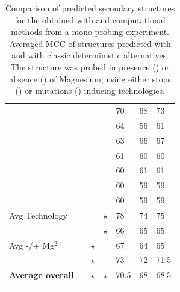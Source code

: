 \documentclass[a4,center,fleqn]{NAR}
\begin{document}
\begin{table}
{\begin{adjustbox}{max width=\linewidth}
\begin{tabular}{@{}lcccHHH}
			\CMCTMg                      &  &  \Stop  &    \Mg    & 70                                   & 68                  & 73                \\
			\OneMSevILUThree                     &  &  \Mut   &   \NoMg   & 64                                   & 56                  & 61                \\
			\DMSMg                       &  &  \Stop  &    \Mg    & 63                                   & 66                  & 67                \\
			\NMIACE                      &  &  \Stop  &   \NoMg   & 61                                   & 60                  & 60                \\
			\OneMSevCE                       &  &  \Stop  &   \NoMg   & 60                                   & 61                  & 61                \\
			\BzCN                        &  &  \Stop  &   \NoMg   & 60                                   & 59                  & 59                \\
			\NAICE                         &  &  \Stop  &   \NoMg   & 60                                   & 59                  & 59                \\ \midrule
			Avg Technology              &          &  \Mut   &  $\star$  & 78                                   & 74                  & 75                \\
			                            &          &  \Stop  &  $\star$  & 66                                   & 65                  & 65                \\
			Avg -/+ Mg$^{2+}$           &          & $\star$ &   \NoMg   & 67                                   & 64                  & 65                \\
			                            &          & $\star$ &    \Mg    & 73                                   & 72                  & 71.5               \\ \midrule
			{\bfseries Average overall} &          & $\star$ &  $\star$  & 70.5                                 & 68                  & 68.5               \\ \bottomrule
			                            &          &         &           &
		\end{tabular}
		\end{adjustbox}\\[1em]}
	
	\caption{Comparison of predicted secondary structures for the \didy{} obtained with \OurTool{} and computational methods from a mono-probing experiment. Averaged MCC of structures predicted with \OurTool{} and with classic deterministic alternatives. The structure was probed in presence (\Mg) or absence (\NoMg) of Magnesium, using either stops (\Stop) or mutations (\Mut) inducing technologies.
	}
	\label{tab:thermo-ipan}
\end{table}
\end{document}

